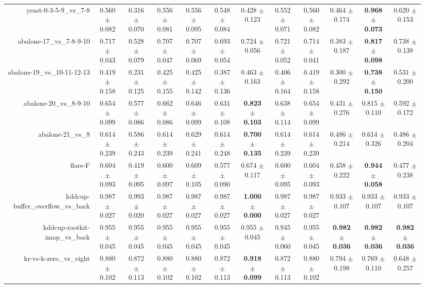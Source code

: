 \begin{table}[!ht]
{\begin{tabular}{r c c c c c c c c c c c}
yeast-0-3-5-9\_vs\_7-8 & 0.560 $\pm$ 0.082 & 0.316 $\pm$ 0.070 & 0.556 $\pm$ 0.081 & 0.556 $\pm$ 0.095 & 0.548 $\pm$ 0.084 & 0.428 $\pm$ 0.123 & 0.552 $\pm$ 0.071 & 0.560 $\pm$ 0.082 & 0.464 $\pm$ 0.174 & \textbf{0.968 $\pm$ 0.073} & 0.620 $\pm$ 0.153 \\
abalone-17\_vs\_7-8-9-10 & 0.717 $\pm$ 0.043 & 0.528 $\pm$ 0.079 & 0.707 $\pm$ 0.047 & 0.707 $\pm$ 0.069 & 0.693 $\pm$ 0.054 & 0.724 $\pm$ 0.056 & 0.721 $\pm$ 0.052 & 0.714 $\pm$ 0.041 & 0.383 $\pm$ 0.187 & \textbf{0.817 $\pm$ 0.098} & 0.738 $\pm$ 0.138 \\
abalone-19\_vs\_10-11-12-13 & 0.419 $\pm$ 0.158 & 0.231 $\pm$ 0.125 & 0.425 $\pm$ 0.155 & 0.425 $\pm$ 0.142 & 0.387 $\pm$ 0.136 & 0.463 $\pm$ 0.163 & 0.406 $\pm$ 0.164 & 0.419 $\pm$ 0.158 & 0.300 $\pm$ 0.292 & \textbf{0.738 $\pm$ 0.150} & 0.531 $\pm$ 0.200 \\
abalone-20\_vs\_8-9-10 & 0.654 $\pm$ 0.099 & 0.577 $\pm$ 0.086 & 0.662 $\pm$ 0.086 & 0.646 $\pm$ 0.099 & 0.631 $\pm$ 0.108 & \textbf{0.823 $\pm$ 0.103} & 0.638 $\pm$ 0.114 & 0.654 $\pm$ 0.099 & 0.431 $\pm$ 0.276 & 0.815 $\pm$ 0.110 & 0.592 $\pm$ 0.172 \\
abalone-21\_vs\_8 & 0.614 $\pm$ 0.239 & 0.586 $\pm$ 0.243 & 0.614 $\pm$ 0.239 & 0.629 $\pm$ 0.241 & 0.614 $\pm$ 0.248 & \textbf{0.700 $\pm$ 0.135} & 0.614 $\pm$ 0.239 & 0.614 $\pm$ 0.239 & 0.486 $\pm$ 0.214 & 0.614 $\pm$ 0.326 & 0.486 $\pm$ 0.204 \\
flare-F & 0.604 $\pm$ 0.093 & 0.419 $\pm$ 0.095 & 0.600 $\pm$ 0.097 & 0.609 $\pm$ 0.105 & 0.577 $\pm$ 0.090 & 0.674 $\pm$ 0.117 & 0.600 $\pm$ 0.095 & 0.604 $\pm$ 0.093 & 0.458 $\pm$ 0.222 & \textbf{0.944 $\pm$ 0.058} & 0.477 $\pm$ 0.238 \\
kddcup-buffer\_overflow\_vs\_back & 0.987 $\pm$ 0.027 & 0.993 $\pm$ 0.020 & 0.987 $\pm$ 0.027 & 0.987 $\pm$ 0.027 & 0.987 $\pm$ 0.027 & \textbf{1.000 $\pm$ 0.000} & 0.987 $\pm$ 0.027 & 0.987 $\pm$ 0.027 & 0.933 $\pm$ 0.107 & 0.933 $\pm$ 0.107 & 0.933 $\pm$ 0.107 \\
kddcup-rootkit-imap\_vs\_back & 0.955 $\pm$ 0.045 & 0.955 $\pm$ 0.045 & 0.955 $\pm$ 0.045 & 0.955 $\pm$ 0.045 & 0.955 $\pm$ 0.045 & 0.955 $\pm$ 0.045 & 0.945 $\pm$ 0.060 & 0.955 $\pm$ 0.045 & \textbf{0.982 $\pm$ 0.036} & \textbf{0.982 $\pm$ 0.036} & \textbf{0.982 $\pm$ 0.036} \\
kr-vs-k-zero\_vs\_eight & 0.880 $\pm$ 0.102 & 0.872 $\pm$ 0.113 & 0.880 $\pm$ 0.102 & 0.880 $\pm$ 0.102 & 0.872 $\pm$ 0.113 & \textbf{0.918 $\pm$ 0.099} & 0.872 $\pm$ 0.113 & 0.880 $\pm$ 0.102 & 0.794 $\pm$ 0.198 & 0.769 $\pm$ 0.110 & 0.648 $\pm$ 0.257 \\

\end{tabular}}
\end{table}
